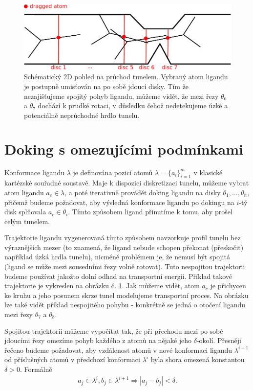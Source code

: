 \begin{figure}[t]
\centering
\includegraphics[width=.8\hsize]{img/tun.pdf}
\caption{Schématický 2D pohled na průchod tunelem. Vybraný atom ligandu je
postupně umisťován na po sobě jdoucí disky. Tím že nezajišťujeme spojitý pohyb
ligandu, můžeme vidět, že mezi řezy $\theta_6$ a $\theta_7$ dochází k prudké rotaci, v
důsledku čehož nedetekujeme úzké a potenciálně neprůchodné hrdlo tunelu.}
\label{fig:lower-bound}
\end{figure}





\section{Doking s omezujícími podmínkami}
Konformace ligandu $ \lambda $ je definována pozicí atomů
$ \lambda = \{a_i\}^m_{i = 1} $ v klasické kartézské souřadné soustavě. Maje
k dispozici diskretizaci tunelu, můžeme vybrat atom ligandu $ a_c \in \lambda $,
a poté iterativně provádět doking ligandu na disky $ \theta_1, \dots, \theta_n $,
přičemž budeme požadovat, aby výsledná konformace ligandu po dokingu na
$ i $-tý disk splňovala $ a_c \in \theta_i $. Tímto způsobem ligand přinutíme
k tomu, aby prošel celým tunelem.

Trajektorie ligandu vygenerovaná tímto způsobem navzorkuje profil tunelu bez
výraznějších mezer (to znamená, že ligand nebude schopen překonat (přeskočit) například
úzká hrdla tunelu), nicméně problémem je, že nemusí být spojitá (ligand se
může mezi sousedními řezy volně rotovat). Tuto nespojitou trajektorii budeme
používat jakožto dolní odhad na transportní energii. Příklad takové trajektorie
je vykreslen na obrázku č. \ref{fig:lower-bound}. Jak můžeme vidět, atom $ a_c $
je přichycen ke kruhu a jeho posunem skrze tunel modelujeme transportní
proces. Na obrázku lze také vidět příklad nespojitého pohybu - konkrétně
se jedná o otočení ligandu mezi řezy $ \theta_7$ a $\theta_8$.

Spojitou trajektorii můžeme vypočítat tak, že při přechodu mezi po sobě jdoucími
řezy omezíme pohyb každého z atomů na nějaké jeho $ \delta $-okolí. Přesněji řečeno
budeme požadovat, aby vzdálenost atomů v nové konformaci ligandu $ \lambda^{i + 1} $
od příslušných atomů v předchozí konformaci $ \lambda^{i} $ byla shora omezená
konstantou $ \delta > 0 $. Formálně
\begin{align}
    a_j \in \lambda^{i}, b_j \in \lambda^{i + 1} \Rightarrow |a_j - b_j| < \delta.
    \label{eq:pattern}
\end{align}

